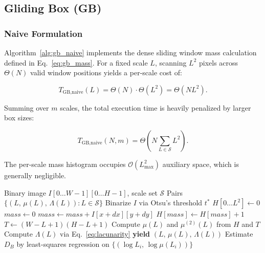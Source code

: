 \subsection{Gliding Box (GB)}
\label{subsec:gb}

\subsubsection{Naive Formulation}

Algorithm~\ref{alg:gb_naive} implements the dense sliding window mass calculation defined in Eq.~\eqref{eq:gb_mass}. For a fixed scale $L$, scanning $L^2$ pixels across $\Theta(N)$ valid window positions yields a per-scale cost of:

\begin{equation}
  T_{\text{GB,naive}}(L)
    = \Theta(N) \cdot \Theta(L^{2})
    = \Theta(NL^{2}).
  \label{eq:gb_naive_scale}
\end{equation}

Summing over $m$ scales, the total execution time is heavily penalized by larger box sizes:

\begin{equation}
  T_{\text{GB,naive}}(N, m)
    = \Theta\!\left(N \sum_{L \in \mathcal{S}} L^{2}\right).
  \label{eq:gb_naive_total}
\end{equation}

The per-scale mass histogram occupies $\mathcal{O}(L_{\max}^{2})$ auxiliary space, which is generally negligible.

\begin{algorithm}[t]
\caption{Naive Gliding Box}
\label{alg:gb_naive}
\begin{algorithmic}[1]
\Require Binary image $I[0\ldots W{-}1][0\ldots H{-}1]$, scale set $\mathcal{S}$
\Ensure Pairs $\{(L,\, \mu(L),\, \Lambda(L)) : L \in \mathcal{S}\}$
\State Binarize $I$ via Otsu's threshold $t^{*}$ \cite{Otsu1979}
  \State $H[0 \ldots L^{2}] \leftarrow 0$ \hfill{}
      \State $\mathit{mass} \leftarrow 0$
          \State $\mathit{mass} \leftarrow \mathit{mass} + I[x{+}dx][y{+}dy]$
        \EndFor
      \EndFor
      \State $H[\mathit{mass}] \leftarrow H[\mathit{mass}] + 1$
    \EndFor
  \EndFor
  \State $T \leftarrow (W{-}L{+}1)(H{-}L{+}1)$
  \State Compute $\mu(L)$ and $\mu^{(2)}(L)$ from $H$ and $T$
  \State Compute $\Lambda(L)$ via Eq.~\eqref{eq:lacunarity}
  \State \textbf{yield} $(L,\, \mu(L),\, \Lambda(L))$
\EndFor
\State Estimate $D_B$ by least-squares regression on $\{(\log L_i,\, \log \mu(L_i))\}$
\end{algorithmic}
\end{algorithm}


